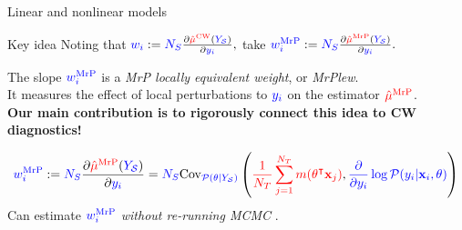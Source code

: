 
\begin{frame}[t]{Linear and nonlinear models}

\pause

\begin{block}{Key idea}
Noting that 
$
\surcol{\w_i} :={} \nsur \frac{\partial \muhatcw}{\partial \surcol{\y_i}},
$
take
$
\surcol{\w_i^\mrp} :={} \nsur \frac{\partial \muhatmrp}{\partial \surcol{\y_i}}.
$
\end{block}


\pause
The slope $\surcol{\w_i^\mrp}$ is a \textit{MrP locally equivalent weight}, or \textit{MrPlew}.\\[1em]
It measures the effect of local perturbations to $\surcol{\y_i}$ on the estimator $\tarcol{\muhat[\mrp]}$.\\[1em]

\textbf{Our main contribution is to rigorously connect this idea to CW diagnostics!}

\pause
$$
\begin{aligned}
\surcol{\w_i^\mrp} :={} 
    \nsur \frac{\partial \muhatmrp}{\partial \surcol{\y_i}} 
        =
        \nsur  \cov{\post}{
            \tarcol{\meantar \m(\theta^\trans \x_j)},
            \surcol{\frac{\partial}{\partial \y_i} \log \p(\y_i \vert \x_i, \theta)}
        }
\end{aligned}
$$
%
Can estimate $\surcol{\w_i^\mrp}$ \textit{without re-running MCMC}
\parencite{gustafson:1996:localposterior,giordano:2018:covariances}.

\end{frame}




